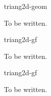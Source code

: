 \begin{Label}{triang2d-geom}
\end{Label}

To be written.

\begin{Label}{triang2d-gf}
\end{Label}

To be written.

\begin{Label}{triang2d-gf}
\end{Label}

To be written.
